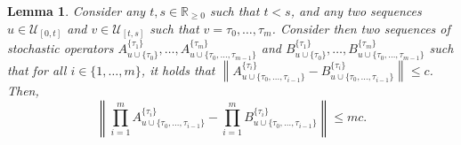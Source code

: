 \documentclass[10pt]{paper}
\newtheorem{lemma}[theorem]{Lemma}
\newcommand{\reals}{\mathbb{R}}
\newcommand{\realsnonneg}{\reals_{\geq 0}}
\newcommand{\norm}[1]{\left\lVert #1 \right\rVert}
\begin{document}

\begin{lemma}\label{lemma:nonmarkov_operator_bound_to_product_bound}
Consider any $t,s\in\realsnonneg$ such that $t<s$, and any two sequences $u\in\mathcal{U}_{[0,t]}$ and $v\in\mathcal{U}_{[t,s]}$ such that $v=\tau_0,\ldots,\tau_m$. Consider then two sequences of stochastic operators $A_{u\cup\{\tau_0\}}^{\{\tau_1\}},\ldots,A_{u\cup\{\tau_0,\ldots,\tau_{m-1}\}}^{\{\tau_m\}}$ and $B_{u\cup\{\tau_0\}}^{\{\tau_1\}},\ldots,B_{u\cup\{\tau_0,\ldots,\tau_{m-1}\}}^{\{\tau_m\}}$ such that for all $i\in\{1,\ldots,m\}$, it holds that $\norm{A_{u\cup\{\tau_0,\ldots,\tau_{i-1}\}}^{\{\tau_i\}} - B_{u\cup\{\tau_0,\ldots,\tau_{i-1}\}}^{\{\tau_i\}}}\leq c$. Then,
\begin{equation*}
\norm{\prod_{i=1}^m A_{u\cup\{\tau_0,\ldots,\tau_{i-1}\}}^{\{\tau_i\}} - \prod_{i=1}^m B_{u\cup\{\tau_0,\ldots,\tau_{i-1}\}}^{\{\tau_i\}}} \leq mc.
\end{equation*}
\end{lemma}
\end{document}

